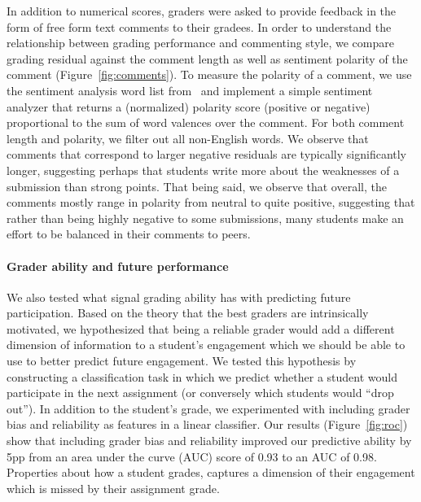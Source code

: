 In addition to numerical scores, graders were asked to provide feedback in the form of
free form text comments to their gradees. In order to understand the relationship between
grading performance and commenting style, we compare
grading residual against the comment length as well as sentiment polarity of the comment (Figure~\ref{fig:comments}).
To measure the polarity of a comment, we use the sentiment analysis
word list from~\cite{nielsen11} and implement a simple sentiment analyzer that returns a (normalized)
polarity score (positive or negative) %
proportional to the sum of word valences over the comment.
For both comment length and polarity, we filter out all non-English words.
We observe that comments that correspond to larger negative residuals are typically significantly longer,
suggesting perhaps that students write more about the weaknesses of a submission than strong points.
That being said, we observe that overall, the comments mostly range in polarity from neutral
to quite positive, suggesting that rather than being highly negative to some submissions,
many students make an effort to be balanced in their comments to peers.

\paragraph{Grader ability and future performance}
We also tested what signal grading ability has with predicting future participation.
Based on the theory that the best graders are
intrinsically motivated, we hypothesized that being a reliable grader would add a different dimension of information
to a student's engagement which we should be able to use to
better predict future engagement. We tested this hypothesis
by constructing a classification task in which we predict
whether a student would participate in the next assignment
(or conversely which students would ``drop out''). In addition to the student's grade, we experimented with including
grader bias and reliability as features in a linear classifier.
Our results (Figure~\ref{fig:roc}) show that including grader bias and
reliability improved our predictive ability by 5pp from an
area under the curve (AUC) score of 0.93 to an AUC of 0.98.
Properties about how a student grades, captures a dimension of their engagement which is missed by their assignment grade.

